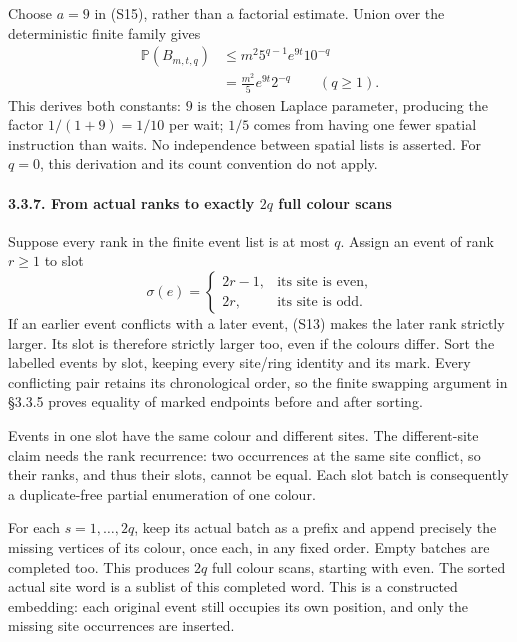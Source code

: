\documentclass[
  11pt,
  a4paper,
]{article}
\begin{document}
Choose \(a=9\) in (S15), rather than a factorial estimate. Union over
the deterministic finite family gives \[
\begin{aligned}
\mathbb P(B_{m,t,q})
&\leq m^2 5^{q-1}e^{9t}10^{-q}\\
&=\frac{m^2}{5}e^{9t}2^{-q}\qquad(q\geq1).
\end{aligned}
\tag{S16}
\] This derives both constants: \(9\) is the chosen Laplace parameter,
producing the factor \(1/(1+9)=1/10\) per wait; \(1/5\) comes from
having one fewer spatial instruction than waits. No independence between
spatial lists is asserted. For \(q=0\), this derivation and its count
convention do not apply.

\paragraph{\texorpdfstring{3.3.7. From actual ranks to exactly \(2q\)
full colour
scans}{3.3.7. From actual ranks to exactly 2q full colour scans}}\label{from-actual-ranks-to-exactly-2q-full-colour-scans}

Suppose every rank in the finite event list is at most \(q\). Assign an
event of rank \(r\geq1\) to slot \[
\sigma(e)=
\begin{cases}
2r-1,&\text{its site is even},\\
2r,&\text{its site is odd}.
\end{cases}
\tag{S17}
\] If an earlier event conflicts with a later event, (S13) makes the
later rank strictly larger. Its slot is therefore strictly larger too,
even if the colours differ. Sort the labelled events by slot, keeping
every site/ring identity and its mark. Every conflicting pair retains
its chronological order, so the finite swapping argument in §3.3.5
proves equality of marked endpoints before and after sorting.

Events in one slot have the same colour and different sites. The
different-site claim needs the rank recurrence: two occurrences at the
same site conflict, so their ranks, and thus their slots, cannot be
equal. Each slot batch is consequently a duplicate-free partial
enumeration of one colour.

For each \(s=1,\ldots,2q\), keep its actual batch as a prefix and append
precisely the missing vertices of its colour, once each, in any fixed
order. Empty batches are completed too. This produces \(2q\) full colour
scans, starting with even. The sorted actual site word is a sublist of
this completed word. This is a constructed embedding: each original
event still occupies its own position, and only the missing site
occurrences are inserted.
\end{document}
